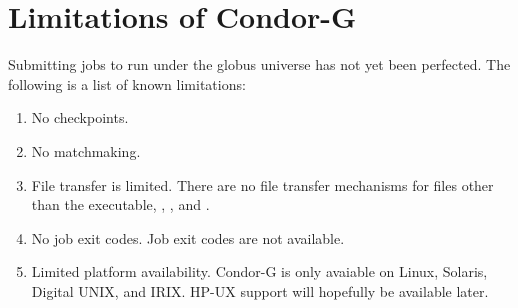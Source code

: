 \section{\label{sec:Condor-G-Limits}Limitations of Condor-G}

Submitting jobs to run under the globus universe has not yet
been perfected.
The following is a list of known limitations:

\begin{enumerate}
\item{No checkpoints.}
\item{No matchmaking.}
\item{File transfer is limited.}
There are no file transfer mechanisms for files other
than the executable, , , and .
\item{No job exit codes.}
Job exit codes are not available.
\item{Limited platform availability.}
Condor-G is only avaiable on Linux, Solaris,
Digital UNIX, and IRIX.
HP-UX support will hopefully be available later.
\end{enumerate}
